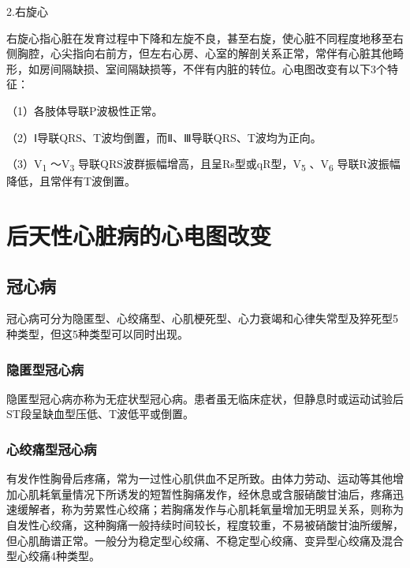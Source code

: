 2.右旋心

右旋心指心脏在发育过程中下降和左旋不良，甚至右旋，使心脏不同程度地移至右侧胸腔，心尖指向右前方，但左右心房、心室的解剖关系正常，常伴有心脏其他畸形，如房间隔缺损、室间隔缺损等，不伴有内脏的转位。心电图改变有以下3个特征：

（1）各肢体导联P波极性正常。

（2）Ⅰ导联QRS、T波均倒置，而Ⅱ、Ⅲ导联QRS、T波均为正向。

（3）V\textsubscript{1} ～V\textsubscript{3}
导联QRS波群振幅增高，且呈Rs型或qR型，V\textsubscript{5}
、V\textsubscript{6} 导联R波振幅降低，且常伴有T波倒置。

\protect\hypertarget{text00050.html}{}{}

\protect\hypertarget{text00050.htmlux5cux23chapter50}{}{}

\chapter{后天性心脏病的心电图改变}

\protect\hypertarget{text00050.htmlux5cux23subid586}{}{}

\section{冠心病}

冠心病可分为隐匿型、心绞痛型、心肌梗死型、心力衰竭和心律失常型及猝死型5种类型，但这5种类型可以同时出现。

\protect\hypertarget{text00050.htmlux5cux23subid587}{}{}

\subsection{隐匿型冠心病}

隐匿型冠心病亦称为无症状型冠心病。患者虽无临床症状，但静息时或运动试验后ST段呈缺血型压低、T波低平或倒置。

\protect\hypertarget{text00050.htmlux5cux23subid588}{}{}

\subsection{心绞痛型冠心病}

有发作性胸骨后疼痛，常为一过性心肌供血不足所致。由体力劳动、运动等其他增加心肌耗氧量情况下所诱发的短暂性胸痛发作，经休息或含服硝酸甘油后，疼痛迅速缓解者，称为劳累性心绞痛；若胸痛发作与心肌耗氧量增加无明显关系，则称为自发性心绞痛，这种胸痛一般持续时间较长，程度较重，不易被硝酸甘油所缓解，但心肌酶谱正常。一般分为稳定型心绞痛、不稳定型心绞痛、变异型心绞痛及混合型心绞痛4种类型。

